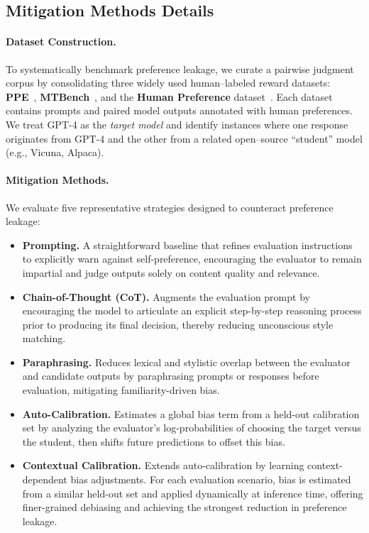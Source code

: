 \documentclass{article} %
\begin{document}
\subsection{Mitigation Methods Details}
\label{Mitigation Methods Details}

\paragraph{Dataset Construction.}
To systematically benchmark preference leakage, we curate a pairwise judgment corpus by consolidating three widely used human–labeled reward datasets: \textbf{PPE}~\cite{perez2022ppe}, \textbf{MTBench}~\cite{zheng2023mtbench}, and the \textbf{Human Preference} dataset~\cite{chiang2024chatbot}. 
Each dataset contains prompts and paired model outputs annotated with human preferences. 
We treat \textsc{GPT-4} as the \emph{target model} and identify instances where one response originates from \textsc{GPT-4} and the other from a related open–source ``student'' model (e.g., Vicuna, Alpaca). 

\paragraph{Mitigation Methods.}
We evaluate five representative strategies designed to counteract preference leakage:

\begin{itemize}[leftmargin=*]
    \item \textbf{Prompting.} A straightforward baseline that refines evaluation instructions to explicitly warn against self-preference, encouraging the evaluator to remain impartial and judge outputs solely on content quality and relevance.
    \item \textbf{Chain-of-Thought (CoT).} Augments the evaluation prompt by encouraging the model to articulate an explicit step-by-step reasoning process prior to producing its final decision, thereby reducing unconscious style matching.
    \item \textbf{Paraphrasing.} Reduces lexical and stylistic overlap between the evaluator and candidate outputs by paraphrasing prompts or responses before evaluation, mitigating familiarity-driven bias.
    \item \textbf{Auto-Calibration.} Estimates a global bias term from a held-out calibration set by analyzing the evaluator’s log-probabilities of choosing the target versus the student, then shifts future predictions to offset this bias.
    \item \textbf{Contextual Calibration.} Extends auto-calibration by learning context-dependent bias adjustments. 
    For each evaluation scenario, bias is estimated from a similar held-out set and applied dynamically at inference time, offering finer-grained debiasing and achieving the strongest reduction in preference leakage.
\end{itemize}
\end{document}
